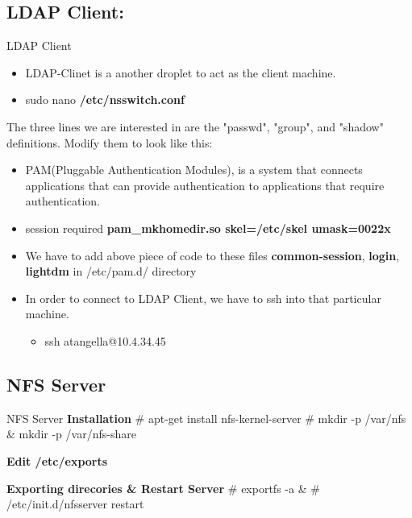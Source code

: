 \documentclass[10pt,xcolor=dvipsnames]{beamer}
\begin{document}
\subsection{LDAP Client:}
\begin{frame}[allowframebreaks]{LDAP Client}
	\begin{itemize}
	\item 	LDAP-Clinet is a another droplet to act as the client machine.
	\item sudo nano \textbf{/etc/nsswitch.conf}
\end{itemize}
		The three lines we are interested in are the "passwd", "group", and "shadow" definitions. 
		Modify them to look like this:
		
		\framebreak
\begin{itemize}
	\item PAM(Pluggable Authentication Modules), is a system that connects applications that can provide authentication to applications that require authentication.	\\
	\item session required \textbf{pam\_mkhomedir.so skel=/etc/skel umask=0022x}
	\item We have to add above piece of code to these files  \textbf{common-session}, \textbf{login}, \textbf{lightdm} in /etc/pam.d/ directory
	\item In order to connect to LDAP Client, we have to ssh into that particular machine.
	 \begin{itemize}
	 	\item ssh atangella@10.4.34.45
		\end{itemize}
	\end{itemize}
\end{frame}

\subsection{NFS Server}
\begin{frame}{NFS Server}
\textbf{Installation} \newline
\# apt-get install nfs-kernel-server \newline
\# mkdir -p /var/nfs \& mkdir -p /var/nfs-share \newline

\textbf{Edit /etc/exports}
 
\textbf{Exporting direcories \& Restart Server} \newline
\# exportfs -a \& \# /etc/init.d/nfsserver restart
\end{frame}
\end{document}
